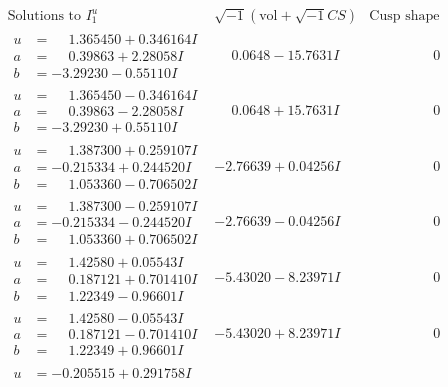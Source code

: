 \documentclass[1p]{elsarticle_modified}
\theoremstyle{definition}
\newcommand{\I}{\sqrt{-1}}
\begin{document}
$$\begin{array}{c|c|c}
\text{Solutions to }I^u_{1}& \I (\text{vol} + \sqrt{-1}CS) & \text{Cusp shape}\\
 \hline 
\begin{aligned}
u &= \phantom{-}1.365450 + 0.346164 I \\
a &= \phantom{-}0.39863 + 2.28058 I \\
b &= -3.29230 - 0.55110 I\end{aligned}
 & \phantom{-}0.0648 - 15.7631 I & \phantom{-0.000000 } 0 \\ \hline\begin{aligned}
u &= \phantom{-}1.365450 - 0.346164 I \\
a &= \phantom{-}0.39863 - 2.28058 I \\
b &= -3.29230 + 0.55110 I\end{aligned}
 & \phantom{-}0.0648 + 15.7631 I & \phantom{-0.000000 } 0 \\ \hline\begin{aligned}
u &= \phantom{-}1.387300 + 0.259107 I \\
a &= -0.215334 + 0.244520 I \\
b &= \phantom{-}1.053360 - 0.706502 I\end{aligned}
 & -2.76639 + 0.04256 I & \phantom{-0.000000 } 0 \\ \hline\begin{aligned}
u &= \phantom{-}1.387300 - 0.259107 I \\
a &= -0.215334 - 0.244520 I \\
b &= \phantom{-}1.053360 + 0.706502 I\end{aligned}
 & -2.76639 - 0.04256 I & \phantom{-0.000000 } 0 \\ \hline\begin{aligned}
u &= \phantom{-}1.42580 + 0.05543 I \\
a &= \phantom{-}0.187121 + 0.701410 I \\
b &= \phantom{-}1.22349 - 0.96601 I\end{aligned}
 & -5.43020 - 8.23971 I & \phantom{-0.000000 } 0 \\ \hline\begin{aligned}
u &= \phantom{-}1.42580 - 0.05543 I \\
a &= \phantom{-}0.187121 - 0.701410 I \\
b &= \phantom{-}1.22349 + 0.96601 I\end{aligned}
 & -5.43020 + 8.23971 I & \phantom{-0.000000 } 0 \\ \hline\begin{aligned}
u &= -0.205515 + 0.291758 I \\

\end{aligned}
\end{array}$$
\end{document}
